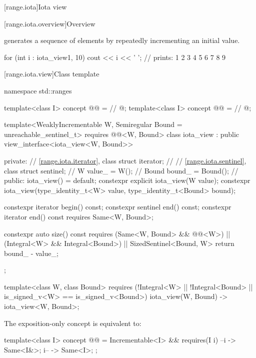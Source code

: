 [range.iota]{Iota view}

[range.iota.overview]{Overview}

\pnum
{} generates a
sequence of elements by repeatedly incrementing an initial value.

\pnum
\begin{example}
\begin{codeblock}
for (int i : iota_view{1, 10})
  cout << i << ' '; // prints: 1 2 3 4 5 6 7 8 9
\end{codeblock}
\end{example}

[range.iota.view]{Class template }

\begin{codeblock}
namespace std::ranges {
  template<class I>
    concept @@ =     // \expos
      @\seebelow@;
  template<class I>
    concept @@ =       // \expos
      @\seebelow@;

  template<WeaklyIncrementable W, Semiregular Bound = unreachable_sentinel_t>
    requires @@<W, Bound>
  class iota_view : public view_interface<iota_view<W, Bound>> {
  private:
    // \ref{range.iota.iterator}, class 
    struct iterator;            // \expos
    // \ref{range.iota.sentinel}, class 
    struct sentinel;            // \expos
    W value_ = W();             // \expos
    Bound bound_ = Bound();     // \expos
  public:
    iota_view() = default;
    constexpr explicit iota_view(W value);
    constexpr iota_view(type_identity_t<W> value,
                        type_identity_t<Bound> bound);

    constexpr iterator begin() const;
    constexpr sentinel end() const;
    constexpr iterator end() const requires Same<W, Bound>;

    constexpr auto size() const
      requires (Same<W, Bound> && @@<W>) ||
               (Integral<W> && Integral<Bound>) ||
               SizedSentinel<Bound, W>
    { return bound_ - value_; }
  };

  template<class W, class Bound>
    requires (!Integral<W> || !Integral<Bound> || is_signed_v<W> == is_signed_v<Bound>)
  iota_view(W, Bound) -> iota_view<W, Bound>;
}
\end{codeblock}

\pnum
The exposition-only  concept is equivalent to:
\begin{itemdecl}
template<class I>
  concept @@ =
    Incrementable<I> && requires(I i) {
      { --i } -> Same<I&>;
      { i-- } -> Same<I>;
    };
\end{itemdecl}

